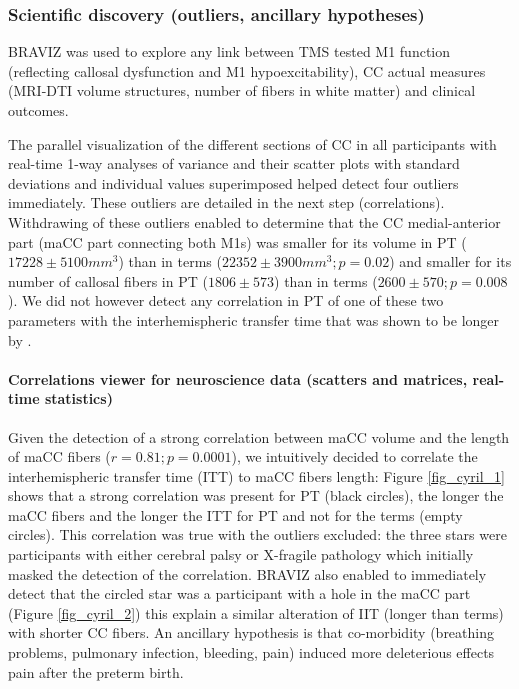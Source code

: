 \documentclass[twocolumn]{svjour3}
\begin{document}
\subsubsection{Scientific discovery (outliers, ancillary hypotheses)}

BRAVIZ was used to explore any link between TMS tested M1 function (reflecting callosal dysfunction and M1 hypoexcitability), CC actual measures (MRI-DTI volume structures, number of fibers in white matter) and clinical outcomes. 

The parallel visualization of the different sections of CC in all participants with real-time 1-way analyses of variance and their scatter plots with standard deviations and individual values superimposed helped detect four outliers immediately. These outliers are detailed in the next step (correlations). Withdrawing of these outliers enabled to determine that the CC medial-anterior part (maCC part connecting both M1s) was smaller for its volume in PT ($17228 \pm 5100 mm^3$) than in terms ($22352 \pm 3900 mm^3; p=0.02$) and smaller for its number of callosal fibers in PT ($1806 \pm 573$) than in terms ($2600 \pm 570; p=0.008$). We did not however detect any correlation in PT of one of these two parameters with the interhemispheric transfer time that was shown to be longer by \cite{schneider_cerebral_2012}. 

\paragraph{Correlations viewer for neuroscience data (scatters and matrices, real-time statistics)}

Given the detection of a strong correlation between maCC volume and the length of maCC fibers ($r=0.81; p=0.0001$), we intuitively decided to correlate the interhemispheric transfer time (ITT) to maCC fibers length: Figure \ref{fig_cyril_1} shows that a strong correlation was present for PT (black circles), the longer the maCC fibers and the longer the ITT for PT and not for the terms (empty circles). This correlation was true with the outliers excluded: the three stars were participants with either cerebral palsy or X-fragile pathology which initially masked the detection of the correlation. BRAVIZ also enabled to immediately detect that the circled star was a participant with a hole in the maCC part (Figure \ref{fig_cyril_2}) this explain a similar alteration of IIT (longer than terms) with shorter CC fibers. An ancillary hypothesis is that co-morbidity (breathing problems, pulmonary infection, bleeding, pain) induced more deleterious effects pain after the preterm birth.
\end{document}
